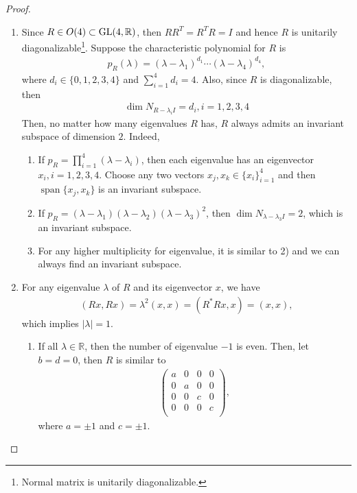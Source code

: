 \documentclass[11pt]{article}
\theoremstyle{definition}
\numberwithin{equation}{subsection}
\begin{document}
\begin{proof}
~\begin{enumerate}[label=(\alph*)]
    \item Since $R \in O(4) \subset {\rm GL}(4, \mathbb{R})$, then $RR^T = R^T R = I$ and hence $R$ is unitarily diagonalizable\footnote{Normal matrix is unitarily diagonalizable.}. Suppose the characteristic polynomial for $R$ is 
    \begin{align*}
        p_R(\lambda) = (\lambda - \lambda_1)^{d_1} \cdots (\lambda - \lambda_4)^{d_4},
    \end{align*}
    where $d_i \in \{0, 1, 2, 3, 4\}$ and $\sum^4_{i=1} d_i = 4$. Also, since $R$ is diagonalizable, then 
    \begin{align*}
        \dim N_{R-\lambda_i I} = d_i, i = 1,2,3,4
    \end{align*}
    Then, no matter how many eigenvalues $R$ has, $R$ always admits an invariant subspace of dimension $2$. Indeed,
    \begin{enumerate}[label=\arabic*)]
        \item If $p_R = \prod^4_{i=1} (\lambda - \lambda_i)$, then each eigenvalue has an eigenvector $x_i, i = 1,2,3,4$. Choose any two vectors $x_j, x_k \in \{x_i\}^4_{i=1}$ and then $\operatorname{span}\{x_j, x_k\}$ is an invariant subspace.
        
        \item If $p_R = (\lambda - \lambda_1)(\lambda - \lambda_2)(\lambda - \lambda_3)^2$, then $\dim N_{\lambda - \lambda_3 I} = 2$, which is an invariant subspace. 
        
        \item For any higher multiplicity for eigenvalue, it is similar to 2) and we can always find an invariant subspace.
    \end{enumerate}
    
    \item For any eigenvalue $\lambda$ of $R$ and its eigenvector $x$, we have
    \begin{align*}
        (Rx, Rx) = \lambda^2 (x, x) = (R^*Rx, x) = (x,x),
    \end{align*}
    which implies $|\lambda| = 1$.
    \begin{enumerate}[label=\arabic*)]
        \item If all $\lambda \in \mathbb{R}$, then the number of eigenvalue $-1$ is even. Then, let $b = d = 0$, then $R$ is similar to 
        \begin{align*}
            \begin{pmatrix}
                a & 0 & 0 & 0 \\
                0 & a & 0 & 0\\
                0 & 0 & c & 0 \\
                0 & 0 & 0 & c\\ 
            \end{pmatrix},
        \end{align*}
        where $a = \pm 1$ and $c = \pm 1$.
        

\end{enumerate}
\end{enumerate}
\end{proof}
\end{document}
